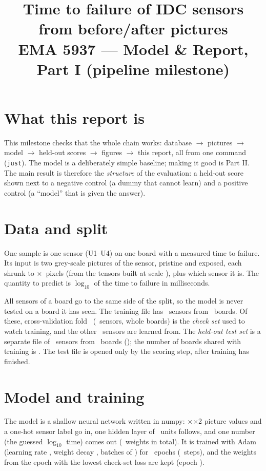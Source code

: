 \documentclass[11pt]{article}
\title{Time to failure of IDC sensors from before/after pictures\\[0.3em]
       \large EMA 5937 --- Model \& Report, Part I (pipeline milestone)}
\author{\reportauthor}
\date{}
\begin{document}
\maketitle

\section{What this report is}

This milestone checks that the whole chain works: database $\rightarrow$ pictures $\rightarrow$ model
$\rightarrow$ held-out scores $\rightarrow$ figures $\rightarrow$ this report, all from one command (\texttt{just}).
The model is a deliberately simple baseline; making it good is Part II.  The main result is therefore
the \emph{structure} of the evaluation: a held-out score shown next to a negative control (a dummy
that cannot learn) and a positive control (a ``model'' that is given the answer).

\section{Data and split}

One sample is one sensor (U1--U4) on one board with a measured time to failure.  Its input is two
grey-scale pictures of the sensor, pristine and exposed, each shrunk to \Pixels$\times$\Pixels\ pixels
(from the tensors built at scale \Scale), plus which sensor it is.  The quantity to predict is
$\log_{10}$ of the time to failure in milliseconds.

All sensors of a board go to the same side of the split, so the model is never tested on a board it
has seen.  The training file has \NTrainFile\ sensors from \NBoardsTrain\ boards.  Of these,
cross-validation fold \ValFold\ (\NCheck\ sensors, whole boards) is the \emph{check set} used to watch training, and
the other \NLearned\ sensors are learned from.  The \emph{held-out test set} is a separate file of
\NTest\ sensors from \NBoardsTest\ boards (\PerSensor); the number of boards shared with training
is \NBoardsShared.  The test file is opened only by the scoring step, after training has finished.

\section{Model and training}

The model is a shallow neural network written in numpy: \Pixels$\times$\Pixels$\times$2 picture
values and a one-hot sensor label go in, one hidden layer of \Hidden\ units follows, and one number
(the guessed $\log_{10}$ time) comes out (\NWeights\ weights in total).  It is trained with Adam (learning rate
\LearningRate, weight decay \WeightDecay, batches of \Batch) for \Epochs\ epochs (\NSteps\ steps), and the weights
from the epoch with the lowest check-set loss are kept (epoch \BestEpoch).
\end{document}
